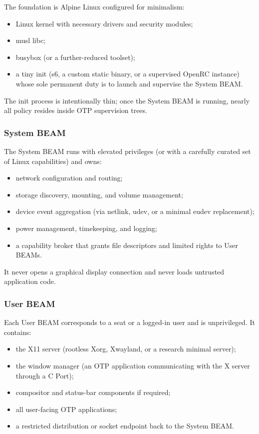 \documentclass{article}
\begin{document}
The foundation is Alpine Linux configured for minimalism:
\begin{itemize}[nosep]
  \item Linux kernel with necessary drivers and security modules;
  \item musl libc;
  \item busybox (or a further-reduced toolset);
  \item a tiny init (s6, a custom static binary, or a supervised OpenRC instance) whose sole permanent duty is to launch and supervise the System BEAM.
\end{itemize}

The init process is intentionally thin; once the System BEAM is running, nearly all policy resides inside OTP supervision trees.

\subsubsection{System BEAM}

The System BEAM runs with elevated privileges (or with a carefully curated set of Linux capabilities) and owns:
\begin{itemize}[nosep]
  \item network configuration and routing;
  \item storage discovery, mounting, and volume management;
  \item device event aggregation (via netlink, udev, or a minimal eudev replacement);
  \item power management, timekeeping, and logging;
  \item a capability broker that grants file descriptors and limited rights to User BEAMs.
\end{itemize}

It never opens a graphical display connection and never loads untrusted application code.

\subsubsection{User BEAM}

Each User BEAM corresponds to a seat or a logged-in user and is unprivileged.
It contains:
\begin{itemize}[nosep]
  \item the X11 server (rootless Xorg, Xwayland, or a research minimal server);
  \item the window manager (an OTP application communicating with the X server through a C Port);
  \item compositor and status-bar components if required;
  \item all user-facing OTP applications;
  \item a restricted distribution or socket endpoint back to the System BEAM.
\end{itemize}
\end{document}
